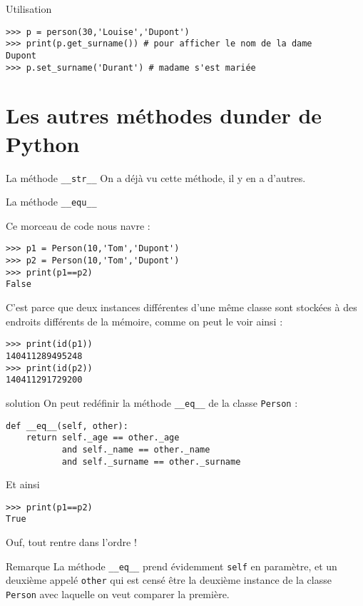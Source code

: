 \documentclass[10pt]{beamer}
\begin{document}
\begin{frame}[fragile]{Utilisation}

\begin{verbatim}
>>> p = person(30,'Louise','Dupont')
>>> print(p.get_surname()) # pour afficher le nom de la dame
Dupont
>>> p.set_surname('Durant') # madame s'est mariée
\end{verbatim}
\end{frame}
\section{Les autres méthodes dunder de Python}
\begin{frame}{La méthode \texttt{\_\_str\_\_}}
	On a déjà vu cette méthode, il y en a d'autres.
\end{frame}
\begin{frame}[fragile]{La méthode \texttt{\_\_equ\_\_}}
	
Ce morceau de code nous navre :
	
\begin{verbatim}
>>> p1 = Person(10,'Tom','Dupont')
>>> p2 = Person(10,'Tom','Dupont')
>>> print(p1==p2)
False
\end{verbatim}
C'est parce que deux instances différentes d'une même classe sont stockées à des endroits différents de la mémoire, comme on peut le voir ainsi :
\begin{verbatim}
>>> print(id(p1))
140411289495248
>>> print(id(p2))
140411291729200
\end{verbatim}
\end{frame}
\begin{frame}[fragile]{solution}
On peut redéfinir la méthode \texttt{__eq__} de la classe \texttt{Person} :
\begin{verbatim}
def __eq__(self, other):
    return self._age == other._age 
           and self._name == other._name 
           and self._surname == other._surname
\end{verbatim}
Et ainsi
\begin{verbatim}
>>> print(p1==p2)
True
\end{verbatim}
Ouf, tout rentre dans l'ordre !
\end{frame}
\begin{frame}[fragile]{Remarque}
	La méthode \texttt{__eq__} prend évidemment \texttt{self} en paramètre, et un deuxième appelé \texttt{other} qui est censé être la deuxième instance de la classe \texttt{Person} avec laquelle on veut comparer la première.

\end{frame}
\end{document}
